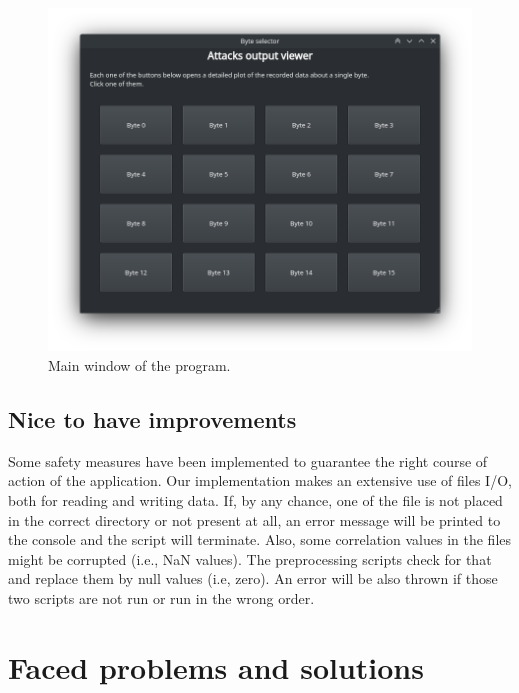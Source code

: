 \documentclass[11pt,a4paper]{article}
\begin{document}
\begin{figure}[H]
    \centering
    \includegraphics[scale=0.6]{main_window.png}
    \caption{Main window of the program.}
    \label{fig:main_window}
\end{figure}

\subsection{Nice to have improvements}
Some safety measures have been implemented to guarantee the right course of action of the application. Our implementation makes an extensive use of files I/O, both for reading and writing data. If, by any chance, one of the file is not placed in the correct directory or not present at all, an error message will be printed to the console and the script will terminate. Also, some correlation values in the files might be corrupted (i.e., NaN values). The preprocessing scripts check for that and replace them by null values (i.e, zero). An error will be also thrown if those two scripts are not run or run in the wrong order.


\section{Faced problems and solutions}
\label{sec:faced-problems-and-solutions}
\end{document}
